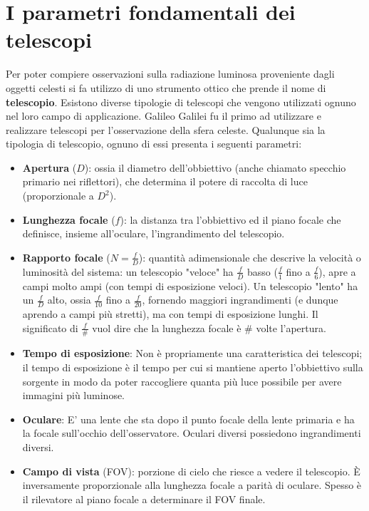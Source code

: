 \documentclass[a4paper, oneside]{book}
\begin{document}
\section{I parametri fondamentali dei telescopi}
Per poter compiere osservazioni sulla radiazione
luminosa proveniente dagli oggetti celesti si fa utilizzo di uno strumento
ottico che prende il nome di \textbf{telescopio}. Esistono diverse tipologie di
telescopi che vengono utilizzati 
ognuno nel loro campo di applicazione.  Galileo Galilei fu il primo ad
utilizzare e realizzare telescopi per l'osservazione della sfera celeste. Qualunque
sia la tipologia di telescopio, ognuno di essi presenta i seguenti parametri:
\begin{itemize}
    \item \textbf{Apertura} ($D$): ossia il diametro dell'obbiettivo (anche chiamato 
    specchio primario nei riflettori), che determina il potere di raccolta di luce (proporzionale a $D^{2}$).
    \item \textbf{Lunghezza focale} ($f$): la distanza tra l'obbiettivo ed il piano focale
    che definisce, insieme all'oculare, l'ingrandimento del telescopio.
    \item \textbf{Rapporto focale} ($N = \frac{f}{D}$): quantità adimensionale che descrive 
    la velocità o luminosità del sistema: un telescopio "veloce" ha $\frac{f}{D}$ basso ($\frac{f}{1}$  fino a $\frac{f}{6}$), 
    apre a campi molto ampi (con tempi di esposizione veloci). Un telescopio "lento" ha 
    un $\frac{f}{D}$ alto, ossia $\frac{f}{10}$ fino a $\frac{f}{20}$, fornendo maggiori ingrandimenti 
    (e dunque aprendo a campi più stretti), ma con tempi di esposizione lunghi. Il significato di $\frac{f}{\#}$ vuol dire che
    la lunghezza focale è $\#$ volte l'apertura.
    \item \textbf{Tempo di esposizione}: Non è propriamente una caratteristica
    dei telescopi; il tempo di esposizione è il tempo per cui si mantiene aperto l'obbiettivo
    sulla sorgente in modo da poter raccogliere quanta più luce possibile
    per avere immagini più luminose.
    \item \textbf{Oculare}: E' una lente che sta dopo il punto focale della lente primaria
    e ha la focale sull'occhio dell'osservatore. Oculari diversi possiedono ingrandimenti diversi. 
    \item \textbf{Campo di vista} (FOV): porzione di cielo che riesce a vedere il telescopio.
    È inversamente proporzionale alla lunghezza focale a
    parità di oculare. Spesso è il rilevatore al piano focale a determinare il FOV finale. 

\end{itemize}
\end{document}
